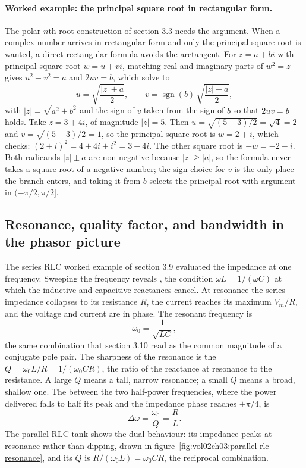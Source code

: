 \paragraph{Worked example: the principal square root in rectangular form.}
The polar $n$th-root construction of section 3.3 needs the argument. When a
complex number arrives in rectangular form and only the principal square
root is wanted, a direct rectangular formula avoids the arctangent. For
$z = a + bi$ with principal square root $w = u + vi$, matching real and
imaginary parts of $w^{2} = z$ gives $u^{2} - v^{2} = a$ and $2uv = b$,
which solve to
\[
u = \sqrt{\frac{|z| + a}{2}}, \qquad
v = \operatorname{sgn}(b)\,\sqrt{\frac{|z| - a}{2}},
\]
with $|z| = \sqrt{a^{2} + b^{2}}$ and the sign of $v$ taken from the sign of
$b$ so that $2uv = b$ holds. Take $z = 3 + 4i$, of magnitude $|z| = 5$. Then
$u = \sqrt{(5 + 3)/2} = \sqrt{4} = 2$ and $v = \sqrt{(5 - 3)/2} = 1$, so the
principal square root is $w = 2 + i$, which checks: $(2 + i)^{2} = 4 + 4i +
i^{2} = 3 + 4i$. The other square root is $-w = -2 - i$. Both radicands
$|z| \pm a$ are non-negative because $|z| \ge |a|$, so the formula never
takes a square root of a negative number; the sign choice for $v$ is the only
place the branch enters, and taking it from $b$ selects the principal root
with argument in $(-\pi/2, \pi/2]$.

\subsection{Resonance, quality factor, and bandwidth in the phasor picture}

The series RLC worked example of section 3.9 evaluated the impedance at one
frequency. Sweeping the frequency reveals , the condition
$\omega L = 1/(\omega C)$ at which the inductive and capacitive reactances
cancel. At resonance the series impedance collapses to its resistance $R$,
the current reaches its maximum $V_{m}/R$, and the voltage and current are in
phase. The resonant frequency is
\[
\omega_{0} = \frac{1}{\sqrt{LC}},
\]
the same combination that section 3.10 read as the common magnitude of a
conjugate pole pair. The sharpness of the resonance is the
 $Q = \omega_{0} L / R = 1/(\omega_{0} C R)$, the
ratio of the reactance at resonance to the resistance. A large $Q$ means a
tall, narrow resonance; a small $Q$ means a broad, shallow one. The
 between the two half-power frequencies, where the power
delivered falls to half its peak and the impedance phase reaches
$\pm\pi/4$, is
\[
\Delta\omega = \frac{\omega_{0}}{Q} = \frac{R}{L}.
\]
The parallel RLC tank shows the dual behaviour: its impedance peaks at
resonance rather than dipping, drawn in
figure~\ref{fig:vol02ch03:parallel-rlc-resonance}, and its $Q$ is
$R/(\omega_{0} L) = \omega_{0} C R$, the reciprocal combination.

